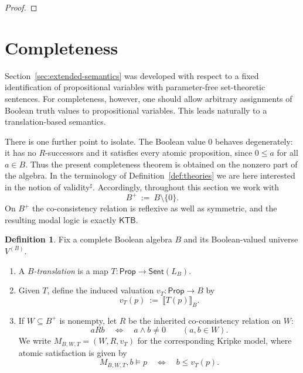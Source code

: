 \documentclass[11pt]{amsart}
\theoremstyle{definition}
\newtheorem{definition}{Definition}[section]
\theoremstyle{plain}
\newcommand{\Prop}{\mathsf{Prop}}
\newcommand{\Sent}{\mathsf{Sent}}
\newcommand{\KTB}{\mathsf{KTB}}
\begin{document}
\begin{proof}
\end{proof}

\section{Completeness}\label{sec:completeness}

Section~\ref{sec:extended-semantics} was developed with respect to a fixed identification of propositional variables with parameter-free
set-theoretic sentences. For completeness, however, one should allow arbitrary assignments of
Boolean truth values to propositional variables. This leads naturally to a translation-based
semantics.

There is one further point to isolate. The Boolean value $0$ behaves degenerately: it has no
$R$-successors and it satisfies every atomic proposition, since $0\leq a$ for all $a\in B$. Thus the
present completeness theorem is obtained on the nonzero part of the algebra. In the terminology of Definition~\ref{def:theories} we are here interested in the notion of validity$^\sharp$. Accordingly, throughout
this section we work with
\[
B^+\ :=\ B\setminus\{0\}.
\]
On $B^+$ the co-consistency relation is reflexive as well as symmetric, and the resulting modal
logic is exactly $\KTB$.

\begin{definition}\label{def:B-translation-nonzero}
Fix a complete Boolean algebra $B$ and its Boolean-valued universe $V^{(B)}$.
\begin{enumerate}
    \item A \emph{$B$-translation} is a map $T:\Prop\to\Sent(L_B)$.
    \item Given $T$, define the induced valuation $v_T:\Prop\to B$ by
    \[
    v_T(p)\ :=\ \llbracket T(p)\rrbracket_B.
    \]
    \item If $W\subseteq B^+$ is nonempty, let $R$ be the inherited co-consistency relation on $W$:
    \[
    aRb \quad\Longleftrightarrow\quad a\wedge b\neq 0 \qquad (a,b\in W).
    \]
    We write $M_{B,W,T}=(W,R,v_T)$ for the corresponding Kripke model, where atomic satisfaction
    is given by
    \[
    M_{B,W,T},b\models p \quad\Longleftrightarrow\quad b\leq v_T(p).
    \]
\end{enumerate}
\end{definition}
\end{document}
